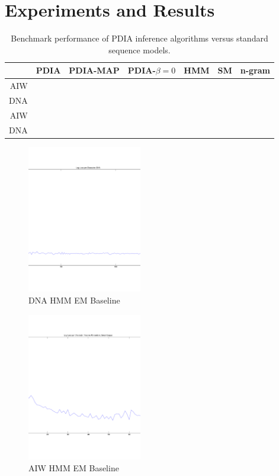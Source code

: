 \section{Experiments and Results}


\begin{table}[t]
    \begin{center}
    \setlength{\tabcolsep}{1.3mm}
\begin{tabular}{r|cccccc}
\hline
& {\bf PDIA } & PDIA-MAP & PDIA-$\beta=0$ & HMM & SM & n-gram \\
\hline
AIW & &&&&&\\
DNA & &&&&& \\
\hline
\hline
AIW & &&&&&\\
DNA & &&&&& \\
\hline
\end{tabular}
\end{center}
\caption[Short]{Benchmark performance of PDIA inference algorithms versus standard sequence models.}
\label{table:results}
\end{table}

\begin{figure}[htbp]
\begin{center}
\includegraphics[width=5cm]{results/dna_hmm_baseline}
\caption{DNA HMM EM Baseline}
\label{fig:dna_hmm_baseline}
\end{center}
\end{figure}


\begin{figure}[htbp]
\begin{center}
\includegraphics[width=5cm]{results/aiw_small_hmm_baseline}
\caption{AIW HMM EM Baseline}
\label{fig:aiw_hmm_baseline}
\end{center}
\end{figure}

